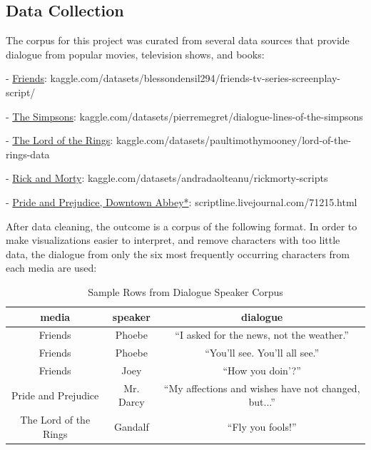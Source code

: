\documentclass{article}
\begin{document}
\begin{titlepage}

\section{Data Collection}

The corpus for this project was curated from several data sources that provide dialogue from popular movies, television shows, and books:

- \href{https://www.kaggle.com/datasets/blessondensil294/friends-tv-series-screenplay-script/data?select=S01E01+Monica+Gets+A+Roommate.txt}{Friends}: kaggle.com/datasets/blessondensil294/friends-tv-series-screenplay-script/
 
- \href{https://www.kaggle.com/datasets/pierremegret/dialogue-lines-of-the-simpsons}{The Simpsons}: kaggle.com/datasets/pierremegret/dialogue-lines-of-the-simpsons

- \href{https://www.kaggle.com/datasets/paultimothymooney/lord-of-the-rings-data?select=lotr_scripts.csv}{The Lord of the Rings}: kaggle.com/datasets/paultimothymooney/lord-of-the-rings-data

- \href{https://www.kaggle.com/datasets/andradaolteanu/rickmorty-scripts}{Rick and Morty}: kaggle.com/datasets/andradaolteanu/rickmorty-scripts

- \href{https://scriptline.livejournal.com/71215.html#cutid6}{Pride and Prejudice, Downtown Abbey*}: scriptline.livejournal.com/71215.html

After data cleaning, the outcome is a corpus of the following format. In order to make visualizations easier to interpret, and remove characters with too little data, the dialogue from only the six most frequently occurring characters from each media are used:

\begin{table}[H]
    \centering
    \begin{tabular}{|c|c|c|}
        \hline
        \textbf{} \textbf{media} & \textbf{speaker} & \textbf{dialogue} \\
        \hline
        Friends & Phoebe &  ``I asked for the news, not the weather.'' \\
        Friends & Phoebe &  ``You'll see. You'll all see.'' \\
        Friends & Joey &  ``How you doin'?'' \\
        Pride and Prejudice & Mr. Darcy &  ``My affections and wishes have not changed, but...''  \\
        The Lord of the Rings & Gandalf &  ``Fly you fools!'' \\
        \hline
    \end{tabular}
    \caption{Sample Rows from Dialogue Speaker Corpus}
    \label{tab:images}
\end{table}


\end{titlepage}
\end{document}
